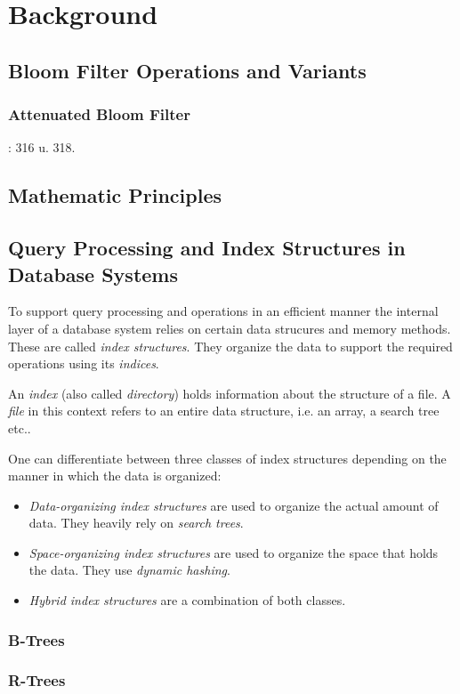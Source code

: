 \chapter{Background}\label{sec:Background}
\section{Bloom Filter Operations and Variants}
\subsection{Attenuated Bloom Filter}
\cite{Sakuma2011}: 316 u. 318.
\section{Mathematic Principles}
\section{Query Processing and Index Structures in Database Systems}
To support query processing and operations in an efficient manner the internal layer of a database system relies on certain data strucures and memory methods. These are called \textit{index structures}. They organize the data to support the required operations using its \textit{indices}.

An \textit{index} (also called \textit{directory}) holds information about the structure of a file. A \textit{file} in this context refers to an entire data structure, i.e. an array, a search tree etc.. 

One can differentiate between three classes of index structures depending on the manner in which the data is organized: 
\begin{itemize}
	\item \textit{Data-organizing index structures} are used to organize the actual amount of data. They heavily rely on \textit{search trees}. 
	\item \textit{Space-organizing index structures} are used to organize the space that holds the data. They use \textit{dynamic hashing}. 
	\item \textit{Hybrid index structures} are a combination of both classes.   
\end{itemize}
\cite{Ottmann2012}
\subsection{B-Trees}	
\cite{Knuth1998}	
\subsection{R-Trees}

